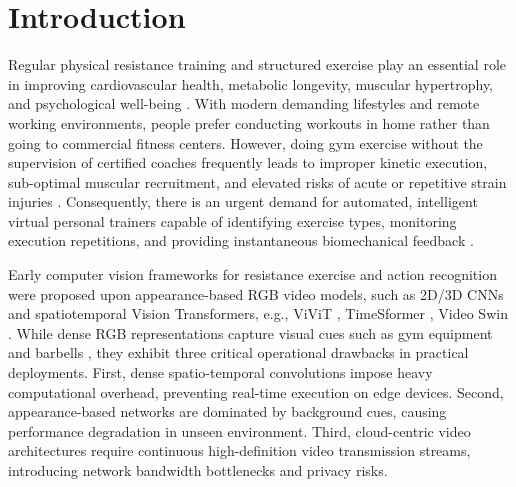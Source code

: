 \documentclass[preprint,12pt]{elsarticle}
\begin{document}
\section{Introduction}

Regular physical resistance training and structured exercise play an essential role in improving cardiovascular health, metabolic longevity, muscular hypertrophy, and psychological well-being \cite{schoenfeld2010}.
With modern demanding lifestyles and remote working environments, people prefer conducting workouts in home rather than going to commercial fitness centers. 
However, doing gym exercise without the supervision of certified coaches frequently leads to improper kinetic execution, sub-optimal muscular recruitment, and elevated risks of acute or repetitive strain injuries \cite{riccio2024}. 
Consequently, there is an urgent demand for automated, intelligent virtual personal trainers capable of identifying exercise types, monitoring execution repetitions, and providing instantaneous biomechanical feedback \cite{garciadevilla2022}.

Early computer vision frameworks for resistance exercise and action recognition were proposed upon appearance-based RGB video models, such as 2D/3D CNNs \cite{donahue2015,carreira2017,feichtenhofer2019} and spatiotemporal Vision Transformers, e.g., ViViT \cite{arnab2021}, TimeSformer \cite{bertasius2021}, Video Swin \cite{liu2022video}. 
While dense RGB representations capture visual cues such as gym equipment and barbells \cite{ng2015}, they exhibit three critical operational drawbacks in practical deployments.
First, dense spatio-temporal convolutions impose heavy computational overhead, preventing real-time execution on edge devices. 
Second, appearance-based networks are dominated by background cues, causing performance degradation in unseen environment. 
Third, cloud-centric video architectures require continuous high-definition video transmission streams, introducing network bandwidth bottlenecks and privacy risks.
\end{document}
